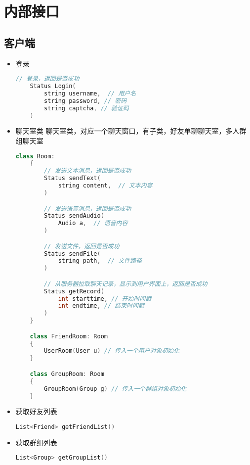 {\color{red}
\section{内部接口}
\subsection{客户端}
\begin{itemize}
    \item 登录
    \begin{lstlisting}[language=c++]
    // 登录，返回是否成功
    Status Login(
        string username,  // 用户名
        string password, // 密码
        string captcha, // 验证码
    )
    \end{lstlisting}

    \item 聊天室类
    聊天室类，对应一个聊天窗口，有子类，好友单聊聊天室，多人群组聊天室
    \begin{lstlisting}[language=c++]
    class Room:
    {
        // 发送文本消息，返回是否成功
        Status sendText(
            string content,  // 文本内容
        )

        // 发送语音消息，返回是否成功
        Status sendAudio(
            Audio a,  // 语音内容
        )

        // 发送文件，返回是否成功
        Status sendFile(
            string path,  // 文件路径
        )

        // 从服务器拉取聊天记录，显示到用户界面上，返回是否成功
        Status getRecord(
            int starttime, // 开始时间戳
            int endtime, // 结束时间戳
        )
    }

    class FriendRoom: Room
    {
        UserRoom(User u) // 传入一个用户对象初始化
    }

    class GroupRoom: Room
    {
        GroupRoom(Group g) // 传入一个群组对象初始化
    }

    \end{lstlisting}

    \item 获取好友列表
    \begin{lstlisting}[language=c++]
    List<Friend> getFriendList()
    \end{lstlisting}

    \item 获取群组列表
    \begin{lstlisting}[language=c++]
    List<Group> getGroupList()
    \end{lstlisting}


\end{itemize}}
